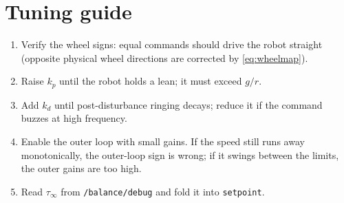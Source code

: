 \documentclass[11pt,a4paper]{article}
\begin{document}
\section{Tuning guide}
\begin{enumerate}
  \item Verify the wheel signs: equal commands should drive the robot straight
        (opposite physical wheel directions are corrected by
        \eqref{eq:wheelmap}).
  \item Raise $k_p$ until the robot holds a lean; it must exceed $g/r$.
  \item Add $k_d$ until post-disturbance ringing decays; reduce it if the
        command buzzes at high frequency.
  \item Enable the outer loop with small gains. If the speed still runs away
        monotonically, the outer-loop sign is wrong; if it swings between the
        limits, the outer gains are too high.
  \item Read $\tau_\infty$ from \texttt{/balance/debug} and fold it into
        \texttt{setpoint}.
\end{enumerate}
\end{document}
